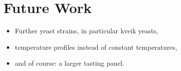 \chapter{Future Work}
\begin{itemize}
  \item Further yeast strains, in particular kveik yeasts,
  \item temperature profiles instead of constant temperatures,
  \item and of course: a larger tasting panel.
\end{itemize}
